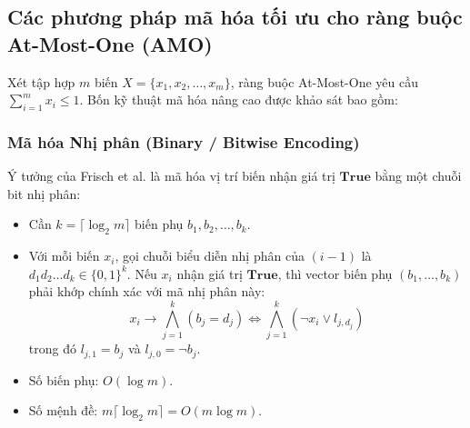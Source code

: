 \documentclass[a4paper,fleqn]{cas-sc}
\begin{document}
\subsection{Các phương pháp mã hóa tối ưu cho ràng buộc At-Most-One (AMO)}
\label{subsec:amo_encodings}
Xét tập hợp $m$ biến $X = \{x_1, x_2, \dots, x_m\}$, ràng buộc At-Most-One yêu cầu $\sum_{i=1}^m x_i \le 1$. Bốn kỹ thuật mã hóa nâng cao được khảo sát bao gồm:

\subsubsection{Mã hóa Nhị phân (Binary / Bitwise Encoding)}
Ý tưởng của Frisch et al. \cite{frisch2005atmost} là mã hóa vị trí biến nhận giá trị $\mathbf{True}$ bằng một chuỗi bit nhị phân:
\begin{itemize}
    \item Cần $k = \lceil \log_2 m \rceil$ biến phụ $b_1, b_2, \dots, b_k$.
    \item Với mỗi biến $x_i$, gọi chuỗi biểu diễn nhị phân của $(i-1)$ là $d_1 d_2 \dots d_k \in \{0, 1\}^k$. Nếu $x_i$ nhận giá trị $\mathbf{True}$, thì vector biến phụ $(b_1, \dots, b_k)$ phải khớp chính xác với mã nhị phân này:
    \begin{equation}
    x_i \to \bigwedge_{j=1}^k (b_j = d_j) \iff \bigwedge_{j=1}^k (\neg x_i \lor l_{j, d_j})
    \end{equation}
    trong đó $l_{j, 1} = b_j$ và $l_{j, 0} = \neg b_j$.
    \item Số biến phụ: $O(\log m)$.
    \item Số mệnh đề: $m \lceil \log_2 m \rceil = O(m \log m)$.
\end{itemize}
\end{document}
